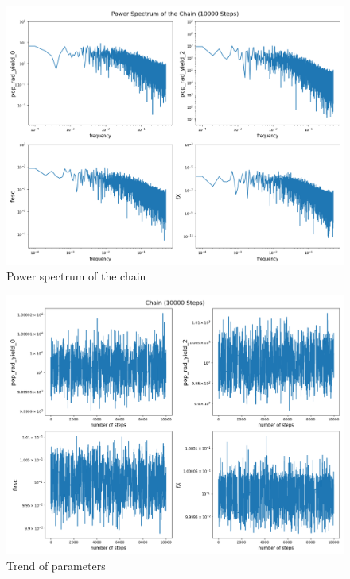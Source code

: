 \documentclass[12pt, TexShade, letterpaper]{report}
\begin{document}
\begin{figure}[h!]
\centering
\includegraphics[scale =0.5]{power_spectrum_known_curve.png}
\caption[Power spectrum of the chain]{Power spectrum of the chain}
\label{fig:power_spectrum_known_curve}
\end{figure}

\begin{figure}[h!]
\centering
\includegraphics[scale =0.5]{chain_known_curve.png}
\caption[Trend of parameters]{Trend of parameters}
\label{fig:chain_known_curve}
\end{figure}
\end{document}
